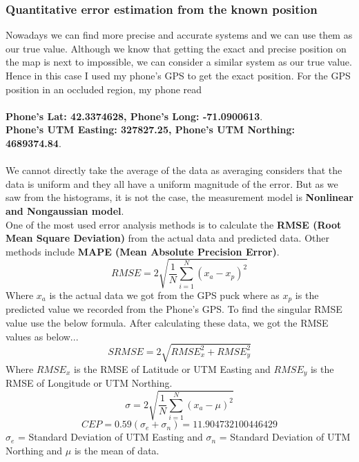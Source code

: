 \documentclass[a4paper]{article}
\begin{document}
\subsubsection{Quantitative error estimation from the known position}
Nowadays we can find more precise and accurate systems and we can use them as our true value. Although we know that getting the exact and precise position on the map is next to impossible, we can consider a similar system as our true value. Hence in this case I used my phone's GPS to get the exact position. For the GPS position in an occluded region, my phone read\\ \\ \textbf{Phone's Lat: 42.3374628, Phone's Long: -71.0900613}.\\ \textbf{Phone's UTM Easting: 327827.25, Phone's UTM Northing: 4689374.84}.\\ \\ 
We cannot directly take the average of the data as averaging considers that the data is uniform and they all have a uniform magnitude of the error. But as we saw from the histograms, it is not the case, the measurement model is \textbf{Nonlinear and Nongaussian model}.\\
One of the most used error analysis methods is to calculate the \textbf{RMSE (Root Mean Square Deviation)} from the actual data and predicted data. Other methods include \textbf{MAPE (Mean Absolute Precision Error)}.
\begin{equation*}
    RMSE=2\sqrt{\frac{1}{N}\sum_{i=1}^N(x_a-x_p)^2}
\end{equation*}
Where $x_a$ is the actual data we got from the GPS puck where as $x_p$ is the predicted value we recorded from the Phone's GPS. To find the singular RMSE value use the below formula. After calculating these data, we got the RMSE values as below...\\
\begin{equation*}
    SRMSE = 2\sqrt{RMSE_{x}^2 + RMSE_{y}^2}
\end{equation*}
Where $RMSE_{x}$ is the RMSE of Latitude or UTM Easting and $RMSE_{y}$ is the RMSE of Longitude or UTM Northing.
\begin{equation*}
    \sigma = 2\sqrt{\frac{1}{N}\sum_{i=1}^N(x_a-\mu)^2}
\end{equation*}
\begin{equation*}
 CEP=0.59(\sigma_e+\sigma_n) =  11.904732100446429
\end{equation*}
$\sigma_e$ = Standard Deviation of UTM Easting and $\sigma_n$ = Standard Deviation of UTM Northing and $\mu$ is the mean of data.
\end{document}
